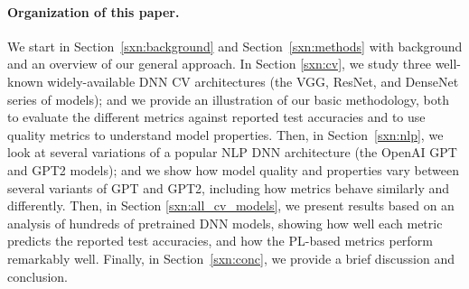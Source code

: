 \paragraph{Organization of this paper.}

We start in Section~\ref{sxn:background} and Section~\ref{sxn:methods} with background and an overview of our general approach.
In Section \ref{sxn:cv}, we study three well-known widely-available DNN CV architectures (the VGG, ResNet, and DenseNet series of models); and we provide an illustration of our basic methodology, both to evaluate the different metrics against reported test accuracies and to use quality metrics to understand model properties.
Then, in Section~\ref{sxn:nlp}, we look at several variations of a popular NLP DNN architecture (the OpenAI GPT and GPT2 models); and we show how model quality and properties vary between several variants of GPT and GPT2, including how metrics behave similarly and differently.
Then, in Section \ref{sxn:all_cv_models}, we present results based on an analysis of hundreds of pretrained DNN models, showing how well each metric predicts the reported test accuracies, and how the PL-based metrics perform remarkably well.
Finally, in Section~\ref{sxn:conc}, we provide a brief discussion and conclusion.



